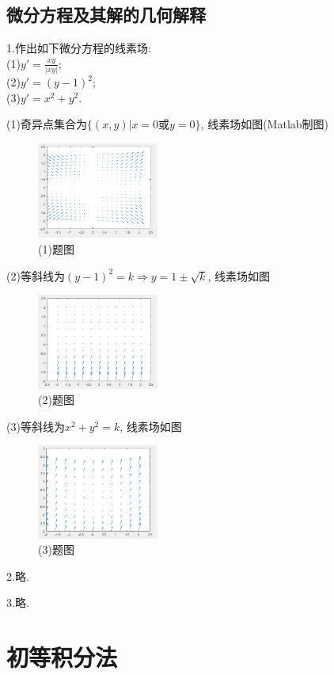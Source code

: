 \documentclass[titlepage,11pt,a4paper,twoside]{report}
\makeatletter
\newenvironment{solve}{\par
	\pushQED{\qed}%
	\normalfont \topsep1\p@\@plus6\p@\relax
	\trivlist
	\item\relax
	{\hspace*{\parindent}{\heiti 解}\@addpunct{:}}\hspace\labelsep\ignorespaces
}{%
	\popQED\endtrivlist\@endpefalse
}
\makeatother
\begin{document}
\section{微分方程及其解的几何解释}
1.作出如下微分方程的线素场:\\
(1)$\displaystyle y'=\frac{xy}{|xy|}$;\\
(2)$y'=(y-1)^2$;\\
(3)$y'=x^2+y^2$.\\
\begin{solve}(1)奇异点集合为$\{(x,y)|x=0\mbox{或}y=0\}$, 线素场如图(Matlab制图)
\begin{figure}[htb]
\centering
\includegraphics[width=4cm]{ODE1_2_1.png}
\caption{(1)题图}
\end{figure}
\newline
(2)等斜线为$(y-1)^2=k\Rightarrow y=1\pm\sqrt{k}$, 线素场如图
\begin{figure}[htb]
\centering
\includegraphics[width=4cm]{ODE1_2_2.png}
\caption{(2)题图}
\end{figure}
\newline
(3)等斜线为$x^2+y^2=k$, 线素场如图
\begin{figure}[htb]
\centering
\includegraphics[width=4cm]{ODE1_2_3.png}
\caption{(3)题图}
\end{figure}
\end{solve}
2.略.\par 
3.略.
\chapter{初等积分法}
\end{document}

